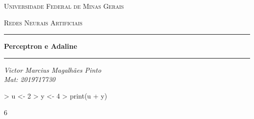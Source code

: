 \documentclass{article}
\begin{document}


\begin{center}

{\scshape\Large Universidade Federal de Minas Gerais \par}
{\scshape\large Redes Neurais Artificiais \par}
\vspace{1cm}

\hrule
\hfill

{\huge \textbf{Perceptron e Adaline}\par}
\hfill
\hrule
\hfill

\vspace{0.5cm}

{\large\itshape Victor Marcius Magalhães Pinto\\Mat: 2019717730\par}

\vspace{2cm}

\end{center}

\newpage

\begin{Schunk}
\begin{Sinput}
> u <- 2
> y <- 4
> print(u + y)
\end{Sinput}
\begin{Soutput}
[1] 6
\end{Soutput}
\end{Schunk}
\end{document}
